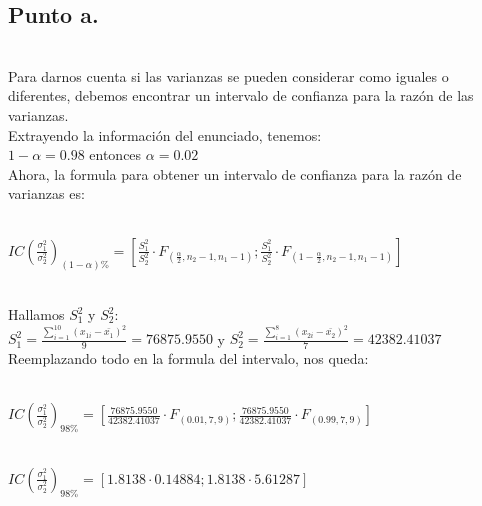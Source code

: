 \documentclass[letterpaper,12pt,onecolumn,titlepage]{article}
\begin{document}
\subsection{Punto a.}
~\\ Para darnos cuenta si las varianzas se pueden considerar como iguales o diferentes, debemos encontrar un intervalo de confianza para la raz\'{o}n de las varianzas.
~\\ Extrayendo la informaci\'{o}n del enunciado, tenemos:
~\\ $1-\alpha=0.98$ entonces $\alpha=0.02$
~\\ Ahora, la formula para obtener un intervalo de confianza para la raz\'{o}n de varianzas es:

~\\ $IC(\frac{\sigma_1^{2}}{\sigma_2^{2}})_{(1-\alpha)\%}=\left[\frac{S_{1} ^{2}}{S_{2} ^{2}}\cdot F_{(\frac{\alpha}{2},n_{2}-1,n_{1}-1)}  ; \frac{S_{1} ^{2}}{S_{2} ^{2}}\cdot F_{(1-\frac{\alpha}{2},n_{2}-1,n_{1}-1)} \right]$

~\\ Hallamos $S_{1}^2$ y $S_{2}^2$:
~\\ $S_{1}^2=\frac{\sum\limits_{i=1}^{10}(x_{1i}-\bar{x_1})^2}{9}=76875.9550$ y $S_{2}^2=\frac{\sum\limits_{i=1}^{8}(x_{2i}-\bar{x_2})^2}{7}=42382.41037$
~\\ Reemplazando todo en la formula del intervalo, nos queda:

~\\ $IC(\frac{\sigma_1^{2}}{\sigma_2^{2}})_{98\%}=\left[\frac{76875.9550}{42382.41037}\cdot F_{(0.01,7,9)}  ; \frac{76875.9550}{42382.41037}\cdot F_{(0.99,7,9)} \right]$

~\\ $IC(\frac{\sigma_1^{2}}{\sigma_2^{2}})_{98\%}=[1.8138\cdot0.14884  ;  1.8138\cdot5.61287]$
\end{document}
